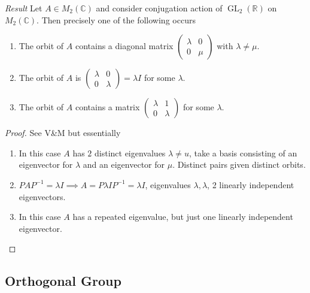 \emph{Result}
Let $A \in M_2(\mathbb{C})$ and consider conjugation action of $\operatorname{GL}_2(\mathbb{R})$ on $M_2(\mathbb{C})$.
Then precisely one of the following occurs
\begin{enumerate}
    \item The orbit of $A$ contains a diagonal matrix $\begin{pmatrix}\lambda & 0 \\0 & \mu\end{pmatrix}$ with $\lambda \neq \mu$.
    \item The orbit of $A$ is $\begin{pmatrix}\lambda & 0 \\0 & \lambda\end{pmatrix} = \lambda I$ for some $\lambda$.
    \item The orbit of $A$ contains a matrix $\begin{pmatrix}\lambda & 1 \\0 & \lambda\end{pmatrix}$ for some $\lambda$.
\end{enumerate} 

\begin{proof}
    See V\&M but essentially 
    \begin{enumerate}
        \item In this case $A$ has $2$ distinct eigenvalues $\lambda \neq u$, take a basis consisting of an eigenvector for $\lambda$ and an eigenvector for $\mu$.
        Distinct pairs given distinct orbits.
        \item $PAP^{-1} = \lambda I \implies A = P \lambda I P^{-1} = \lambda I$, eigenvalues $\lambda, \lambda$, 2 linearly independent eigenvectors.
        \item In this case $A$ has a repeated eigenvalue, but just one linearly independent eigenvector.
    \end{enumerate} 
\end{proof} 

\subsection{Orthogonal Group}


